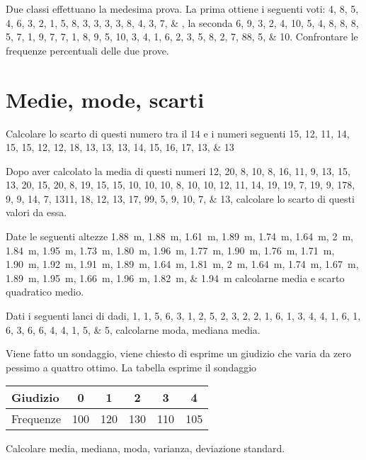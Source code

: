 \begin{esercizio}
	Due classi effettuano la medesima prova. La prima ottiene i seguenti voti: \numlist{4; 8; 5; 4; 6; 3; 2; 1; 5; 8; 3; 3; 3; 3; 8; 4; 3; 7;}, la seconda \numlist{6; 9; 3; 2; 4; 10; 5; 4; 8; 8; 8; 5; 7; 1; 9; 7; 7; 1; 8; 9; 5; 10; 3; 4; 1; 6; 2; 3; 5;
		8; 2; 7; 8 8; 5; 10}. Confrontare le frequenze percentuali delle due prove.
\end{esercizio} 
\section{Medie, mode, scarti}
\begin{esercizio}
	Calcolare lo scarto di questi numero tra il $14$ e i numeri seguenti \numlist{15; 12; 11; 14; 15; 15; 12; 12; 18; 13; 13; 13; 14; 15; 16; 17; 13; 13}
\end{esercizio}
\begin{esercizio}
	Dopo aver calcolato la media di questi numeri \numlist{12; 20; 8; 10; 8; 16; 11; 9; 13; 15; 13; 20; 15; 20; 8; 19; 15; 15; 10; 10; 10; 8;
		10; 10; 12; 11; 14; 19; 19; 7; 19; 9; 17 8; 9; 9; 14; 7; 13 11; 18; 12; 13; 17; 9 9; 5;
		9; 10; 7; 13}, calcolare lo scarto di questi valori da essa.
\end{esercizio}
\begin{esercizio}
	 Date le seguenti altezze \SIlist{1.88; 1.88; 1.61; 1.89; 1.74; 1.64; 2; 1.84; 1.95; 1.73; 1.80; 1.96; 1.77; 1.90; 1.76; 1.71; 1.90;
		1.92; 1.91; 1.89; 1.64; 1.81; 2; 1.64; 1.74; 1.67; 1.89; 1.95; 1.66; 1.96; 1.82; 1.94}{\m} calcolarne media e scarto quadratico medio.
\end{esercizio}
\begin{esercizio}
Dati i seguenti lanci di dadi, \numlist{1; 1; 5; 6; 3; 1; 2; 5; 2; 3; 2; 2; 1; 6; 1; 3; 4; 4; 1; 6; 1; 6; 3; 6; 6; 4; 4; 1; 5; 5}, calcolarne moda, mediana media.
\end{esercizio}
\begin{esercizio}
	
	\item Viene fatto un sondaggio, viene chiesto di esprime un giudizio che varia da zero pessimo a quattro  ottimo. La tabella esprime il sondaggio
	\begin{center}
		\begin{tabular}{l*{5} {S[table-format=3.0]}}
			{Giudizio}	&0  &1  &2  &3&4  \\
			\midrule 
			{Frequenze}	& 100 &120  & 130 & 110&105 \\ 
		\end{tabular}
	\end{center} Calcolare media, mediana, moda, varianza, deviazione standard.
\end{esercizio}

